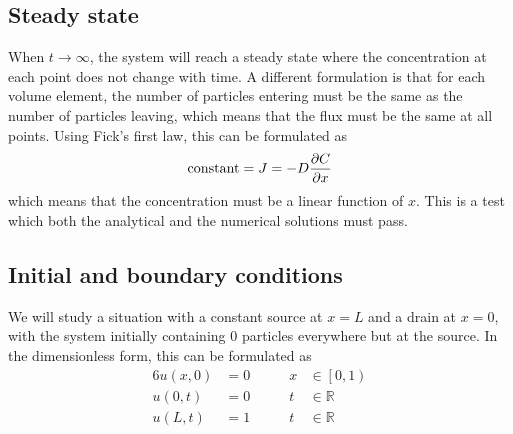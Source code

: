 \subsection{Steady state}\label{steadystate}
When \(t\to\infty\), the system will reach a steady state where the concentration at each point does not change with time. A different formulation is that for each volume element, the number of particles entering must be the same as the number of particles leaving, which means that the flux must be the same at all points. Using Fick's first law, this can be formulated as
\[
\text{constant} = J = -D\pdv{C}{x}
\]
which means that the concentration must be a linear function of \(x\). This is a test which both the analytical and the numerical solutions must pass.


\subsection{Initial and boundary conditions}
We will study a situation with a constant source at \(x=L\) and a drain at \(x=0\), with the system initially containing \(0\) particles everywhere but at the source. In the dimensionless form, this can be formulated as
\begin{alignat*}{6}
u(x,0) &= 0\qquad & x&\in\left[0,1\right)\\
u(0,t) &= 0\qquad & t&\in\mathbb{R}\\
u(L,t) &= 1\qquad & t&\in\mathbb{R}
\end{alignat*}
